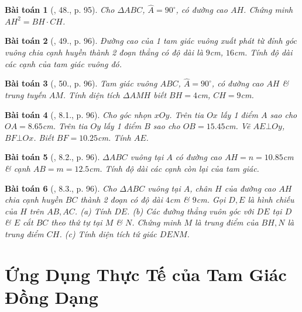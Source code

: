 \documentclass{article}
\newtheorem{baitoan}{Bài toán}
\begin{document}
\begin{baitoan}[\cite{SBT_Toan_8_tap_2}, 48., p. 95]
	Cho $\Delta ABC$, $\widehat{A} = 90^\circ$, có đường cao $AH$. Chứng minh $AH^2 = BH\cdot CH$.
\end{baitoan}

\begin{baitoan}[\cite{SBT_Toan_8_tap_2}, 49., p. 96]
	Đường cao của 1 tam giác vuông xuất phát từ đỉnh góc vuông chia cạnh huyền thành 2 đoạn thẳng có độ dài là $9$\emph{cm}, $16$\emph{cm}. Tính độ dài các cạnh của tam giác vuông đó.
\end{baitoan}

\begin{baitoan}[\cite{SBT_Toan_8_tap_2}, 50., p. 96]
	Tam giác vuông $ABC$, $\widehat{A} = 90^\circ$, có đường cao $AH$ \& trung tuyến $AM$. Tính diện tích $\Delta AMH$ biết $BH = 4$\emph{cm}, $CH = 9$\emph{cm}.
\end{baitoan}

\begin{baitoan}[\cite{SBT_Toan_8_tap_2}, 8.1., p. 96]
	Cho góc nhọn $xOy$. Trên tia $Ox$ lấy 1 điểm $A$ sao cho $OA = 8.65$\emph{cm}. Trên tia $Oy$ lấy 1 điểm $B$ sao cho $OB = 15.45$\emph{cm}. Vẽ $AE\bot Oy$, $BF\bot Ox$. Biết $BF = 10.25$\emph{cm}. Tính $AE$.
\end{baitoan}

\begin{baitoan}[\cite{SBT_Toan_8_tap_2}, 8.2., p. 96]
	$\Delta ABC$ vuông tại $A$ có đường cao $AH = n = 10.85$\emph{cm} \& cạnh $AB = m = 12.5$\emph{cm}. Tính độ dài các cạnh còn lại của tam giác.
\end{baitoan}

\begin{baitoan}[\cite{SBT_Toan_8_tap_2}, 8.3., p. 96]
	Cho $\Delta ABC$ vuông tại $A$, chân $H$ của đường cao $AH$ chia cạnh huyền $BC$ thành 2 đoạn có độ dài $4$\emph{cm} \& $9$\emph{cm}. Gọi $D,E$ là hình chiếu của $H$ trên $AB,AC$. (a) Tính $DE$. (b) Các đường thẳng vuôn góc với $DE$ tại $D$ \& $E$ cắt $BC$ theo thứ tự tại $M$ \& $N$. Chứng minh $M$ là trung điểm của $BH,N$ là trung điểm $CH$. (c) Tính diện tích tứ giác $DENM$.
\end{baitoan}


\section{Ứng Dụng Thực Tế của Tam Giác Đồng Dạng}
\end{document}
